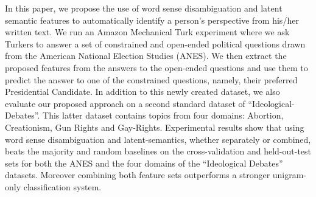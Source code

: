 In this paper, we propose the use of word sense disambiguation and latent semantic features to automatically identify a person's perspective from his/her written text. We run an Amazon Mechanical Turk experiment where we ask Turkers to answer a set of constrained and open-ended political questions drawn from the American National Election Studies (ANES). We then extract the proposed features from the answers to the open-ended questions and use them to  predict the answer to one of the constrained questions, namely, their preferred Presidential Candidate. In addition to this newly created dataset,  we also evaluate our proposed approach on  a second standard dataset of ``Ideological-Debates''. This latter dataset contains topics from four domains: Abortion, Creationism, Gun Rights and Gay-Rights.  Experimental results show that using word sense disambiguation and latent-semantics, whether separately or combined, beats the                                                  majority and random baselines on the cross-validation and held-out-test sets for both the ANES and the four domains of the ``Ideological Debates'' datasets. Moreover combining both feature sets outperforms a stronger                                                  unigram-only classification system.
